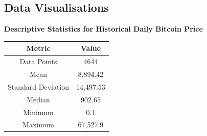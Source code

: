 \documentclass{beamer}
\begin{document}
	\subsection{Data Visualisations}
	\begin{frame}
	\textbf{Descriptive Statistics for Historical Daily Bitcoin Price}
		\begin{tabular}{|c|c|} \hline
			Metric & Value \\ \hline
			Data Points & 4644 \\ 
			Mean & 8,894.42 \\
			Standard Deviation & 14,497.53 \\
			Median & 902.65\\
			Minimum & 0.1\\
			Maximum & 67,527.9\\ \hline
		\end{tabular}
		\end{frame}
\end{document}
